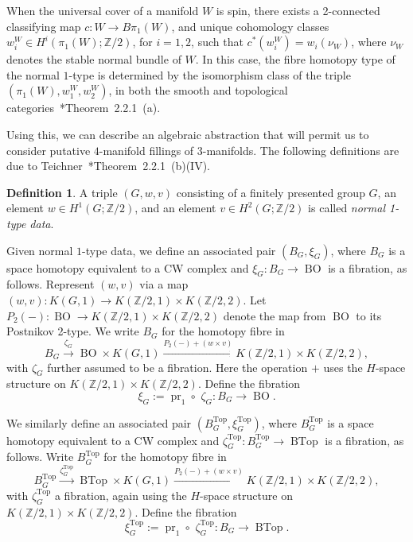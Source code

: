 \documentclass[a4paper, reqno]{amsart}
\theoremstyle{definition}
\newtheorem{definition}[proposition]{Definition}
\theoremstyle{remark}
\renewcommand{\top}{\mathrm{Top}}
\newcommand{\Z}{\mathbb{Z}}
\DeclareMathOperator{\BTop}{BTop}
\DeclareMathOperator{\BO}{BO}
\DeclareMathOperator{\pr}{pr}
\begin{document}
When the universal cover of a manifold $W$ is spin, there exists a 2-connected classifying map $c \colon W \to B\pi_1(W)$, and unique cohomology classes $w_i^W \in H^i(\pi_1(W);\Z/2)$, for $i=1,2$, such that $c^*(w_i^W) = w_i(\nu_W)$, where $\nu_W$ denotes the stable normal bundle of $W$. In this case, the fibre homotopy type of the normal $1$-type is determined by the isomorphism class of the triple $(\pi_1(W), w_1^W, w_2^W)$, in both the smooth and topological categories~\cite{teichnerthesis}*{Theorem~2.2.1~(a)}. 

Using this, we can describe an algebraic abstraction that will permit us to consider putative $4$-manifold fillings of $3$-manifolds. The following definitions are due to Teichner~\cite{teichnerthesis}*{Theorem~2.2.1~(b)(IV)}.

\begin{definition}\label{def:key-pullback}
A triple $(G,w,v)$ consisting of a finitely presented group $G$, an element $w \in H^1(G;\Z/2)$, and an element $v \in H^2(G;\Z/2)$ is called \emph{normal 1-type data}. 

Given normal $1$-type data, we define an associated pair $(B_G,\xi_G)$, where $B_G$ is a space homotopy equivalent to a CW complex and $\xi_G\colon B_G\to \BO$ is a fibration, as follows. Represent $(w,v)$ via a map $(w,v) \colon K(G,1) \xrightarrow{} K(\Z/2,1) \times K(\Z/2,2)$. 
Let $P_2(-) \colon \BO \to K(\Z/2,1) \times K(\Z/2,2)$ denote the map from $\BO$ to its Postnikov 2-type. 
We  write $B_G$ for the homotopy fibre in 
\begin{equation}\label{eqn:defn-of-B_G}
B_G \xrightarrow{\zeta_G} \BO \times K(G,1) \xrightarrow{P_2(-) + (w \times v)} K(\Z/2,1) \times K(\Z/2,2), 
\end{equation}
with $\zeta_G$ further assumed to be a fibration. 
Here the operation $+$ uses the $H$-space structure on $K(\Z/2,1) \times K(\Z/2,2)$. 
Define the fibration
\[\xi_G:=\pr_1\circ\,\, \zeta_G\colon B_G\to \BO.\]

We similarly define an associated pair $(B^{\top}_G,\xi^\top_G)$, where $B^{\top}_G$ is a space homotopy equivalent to a CW complex and $\zeta^\top_G\colon B^{\top}_G\to \BTop$ is a fibration, as follows. Write $B^{\top}_G$ for the homotopy fibre in 
\begin{equation}\label{eqn:defn-of-B_G-top}
B^{\top}_G \xrightarrow{\zeta^{\top}_G} \BTop \times K(G,1) \xrightarrow{P_2(-) + (w \times v)} K(\Z/2,1) \times K(\Z/2,2), 
\end{equation}
with $\zeta^{\top}_G$ a fibration, again using the $H$-space structure on $K(\Z/2,1) \times K(\Z/2,2)$. 
Define the fibration
\[\xi^{\top}_G:=\pr_1\circ\,\, \zeta^{\top}_G\colon B_G\to\BTop.\]
\end{definition}
\end{document}
